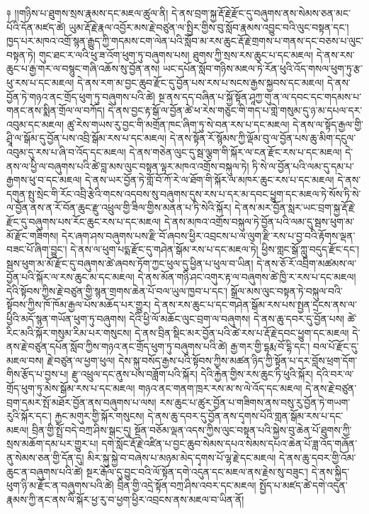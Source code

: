 \documentclass{article}
\begin{document}
༈ །།གཉིས་པ་ཐུགས་སྲས་རྣམས་དང་མཇལ་ཚུལ་ནི། དེ་ནས་བྲག་སྐྱ་རྡོ་རྗེ་རྫོང་དུ་བཞུགས་ནས་སེམས་ཅན་མང་པོའི་དོན་མཛད་ཚེ། ཡུམ་རྡོ་རྗེ་རྣལ་འབྱོར་མས་རྗེ་བཙུན་ལ་སྤྱིར་གྱིས་བུ་སློབ་རྣམས་འབྱུང་བའི་ལུང་བསྟན་དང་། ཁྱད་པར་མཁའ་འགྲོ་སྙན་རྒྱུད་ཀྱི་གདམས་ངག་ལེན་པའི་སློབ་མ་རས་ཆུང་རྡོ་རྗེ་གྲགས་པ་གནས་དང་བཅས་པ་ལུང་བསྟན་ཏེ། གུང་ཐང་ར་ལའི་ཕུ་ཟ་འོག་ཕུག་ཏུ་བཞུགས་པས། ཐུགས་ཀྱི་སྲས་རས་ཆུང་པ་དང་མཇལ། དེ་ནས་རས་ཆུང་པ་རྒྱ་གར་ལ་བསྙུང་གཞི་འཆོས་སུ་བྱོན་ནས། ཡང་དཔོན་སློབ་གཉིས་མཇལ་ཏེ་རོན་ཕུའི་འོད་གསལ་ཕུག་ཏུ་རྩ་ཕུ་རས་པ་དང་མཇལ། དེ་ནས་རག་མ་བྱང་ཆུབ་རྫོང་དུ་བྱོན་པས་རས་པ་སངས་རྒྱས་སྐྱབས་དང་མཇལ། དེ་ནས་བྱོན་ཏེ་གཉའ་ནང་གྲོད་ཕུག་ཏུ་བཞུགས་པའི་ཚེ། སྔ་ནས་དད་བཞིན་པ་སྐྱོ་སྟོན་ཤཱཀྱ་གུ་ན་ལ་དབང་དང་གདམས་པ་གནང་ནས་སྨིན་གྲོལ་ལ་བཀོད། དེ་ནས་བྱང་རྟ་སྒོ་ལ་བྱོན་ཚེ་ཕ་རེས་གཅུང་གི་གད་པ་གླེ་གསུམ་དུ་ཉ་མ་དཔལ་དར་འབུམ་དང་མཇལ། ཚུ་རེས་གཡས་རུ་བྱང་གི་མགྲོན་ཁང་ཞིག་ཏུ་སེ་བན་རས་པ་དང་མཇལ། དེ་ནས་ལ་སྟོད་རྒྱལ་གྱི་ཤྲཱི་ལ་སྒོམ་དུ་བྱོན་པས་འབྲི་སྒོམ་རས་པ་དང་མཇལ། དེ་ནས་སྟོན་རོ་སྙོམས་ཀྱི་ལྡོམ་བུ་ལ་བྱོན་པས་ཆུ་མིག་དངུལ་འབུམ་དུ་རས་པ་ཞི་བ་འོད་དང་མཇལ། དེ་ནས་གཅེན་ལུང་དུ་སྦ་ལྕག་གི་སྐོར་ལ་ངན་རྫོང་རས་པ་དང་མཇལ། དེ་ནས་ལ་ཕྱི་ལ་བཞུགས་པའི་ཚེ་བླ་མས་ལུང་བསྟན་ལྟར་མཁའ་འགྲོས་བསྐུལ་ཏེ། ཏི་སེ་ལ་བྱོན་པའི་ལམ་དུ་དམ་པ་རྒྱགས་ཕུ་བ་དང་མཇལ། དེ་ནས་ཡར་བྱོན་ཏེ་གློ་བོ་ཀོ་རེ་ལ་ཐོག་གི་སྐོར་ལ་མཁར་ཆུང་རས་པ་དང་མཇལ། དེ་ནས་དགུན་སྤུ་སྲེང་གི་རོང་འབྲི་རྩེའི་གངས་འདབས་སུ་བཞུགས་དུས་རས་པ་དར་མ་དབང་ཕྱུག་དང་མཇལ་ཏེ་སོས་ཏི་སེ་ལ་བྱོན་ནས་ན་རོ་བོན་ཆུང་རྫུ་འཕྲུལ་གྱི་ཟིལ་གྱིས་མནན་པ་ཏི་སེའི་སྐོར། དེ་ནས་མར་བྱོན་སླར་ཡང་བྲག་སྐྱ་རྡོ་རྗེ་རྫོང་དུ་བཞུགས་པས་རོང་ཆུང་རས་པ་དང་མཇལ། དེ་ནས་མཁའ་འགྲོས་བསྐུལ་ཏེ་བྱོན་པའི་ལམ་དུ་སྦས་ཕུག་མ་མོ་རྫོང་གཟིགས། དེར་ཞག་ཤས་བཞུགས་པས་རྫི་བོ་ཞབས་ཕྱིར་འབྲངས་པ་ལ་ལུག་རྫི་རས་པ་བྱ་བའི་རྟོགས་ལྡན་བཟང་པོ་ཞིག་བྱུང་། དེ་ནས་ལ་ཕུག་པདྨ་རྫོང་དུ་གཤེན་སྒོམ་རས་པ་དང་མཇལ་ཏེ། ཕྱིས་གླང་སྒོ་ཀླུ་བདུད་རྫོང་དང་། སྦས་ཕུག་མ་མོ་རྫོང་དུ་བཞུགས་ཚེ་ཞབས་ཏོག་ཀྱང་ཕུལ་དུ་ཕྱིན་པ་ཕུལ་བ་ཡིན། དེ་ནས་ཅོ་རོ་འབྲིག་མཚམས་ལ་བྱོན་པའི་སྐོར་ལ་རས་ཆུང་མ་དང་མཇལ། དེ་ནས་མོན་གཉི་ཤང་འགུར་རྟ་ལ་བཞུགས་ཚེ་ཁྱི་ར་རས་པ་དང་མཇལ། དེའི་སྟོབས་ཀྱིས་རྗེ་བཙུན་གྱི་སྙན་གྲགས་ཆེན་པོ་བལ་ཡུལ་ཁྱབ་པ་དང་། སྒྲོལ་མས་ལུང་བསྟན་ཏེ་བསྐུལ་བའི་སྟོབས་ཀྱིས་ཁོ་ཁོམ་རྒྱལ་པོས་མཆོད་པར་གྱུར། དེ་ནས་རས་ཆུང་པ་དང་གཤེན་སྒོམ་རས་པས་སྤྱན་དྲངས་ནས་ལ་ཕྱིའི་མདོ་སྙན་གཡོན་ཕུག་ཏུ་བཞུགས། དེའི་ཕྱི་ལོ་མཆོང་ལུང་བྲག་ལ་བཞུགས། དེ་ནས་ཆུ་དབར་དུ་བྱོན་པས། ཚེ་རིང་མའི་སྐོར་གསུམ་རིམ་པར་གསུངས། དེ་ནས་བྲིན་སྡིང་མར་བྱོན་པའི་ཚེ་རས་པ་རྡོ་རྗེ་དབང་ཕྱུག་དང་མཇལ། དེ་ནས་རྗེ་བཙུན་དཔོན་སློབ་ཀྱིས་གཉའ་ནང་གྲོད་ཕུག་ཏུ་བཞུགས་པའི་ཚེ། རྒྱ་གར་གྱི་དྷརྨ་བོ་དྷི་དང་། བལ་པོ་རྫོང་དུ་མཇལ་བས། རྗེ་བཙུན་ལ་ཕྱག་ཕུལ། དེས་སྐུ་བསོད་རྒྱས་པའི་སྟོབས་ཀྱིས་མཚན་ཉིད་ཀྱི་སྟོན་པ་དར་བློས་ཕྲག་དོག་གིས་རྩོད་པ་བྱས་པ། རྫུ་འཕྲུལ་དང་ནུས་པས་བཟློག་པའི་སྐོར། དེའི་རྐྱེན་གྱིས་རས་ཆུང་ཏི་ཕུའི་སྐོར། དེའི་བར་ལ་གྲོད་ཕུག་ཏུ་མེས་སྒོམ་རས་པ་དང་མཇལ། གཉའ་ནང་གནག་ཁྲར་རས་མ་ས་ལེ་འོད་དང་མཇལ། དེ་ནས་རྗེ་བཙུན་བྲག་དམར་སྤོ་མཐོར་བྱོན་ནས་བཞུགས་པ་ལས། རས་ཆུང་པ་ཚུར་བྱོན་པ་གཟིགས་ནས་བསུ་རུ་བྱོན་ཏེ་གཡག་རུའི་སྐོར་དང་། རྐྱང་མགུར་གྱི་སྐོར་གསུངས། དེ་ནས་ཆུ་དབར་དུ་བྱོན་ནས་དྭགས་པོའི་གླན་སྒོམ་རས་པ་དང་མཇལ། བྲིན་གྱི་སྤྲོ་བདེ་བཀྲ་ཤིས་སྒང་དུ། སྔོན་བཅོམ་ལྡན་འདས་ཀྱིས་ལུང་བསྟན་པའི་སྐྱེས་བུ་ཆེན་པོ་ཐུགས་ཀྱི་སྲས་མཆོག་དམ་པར་གྱུར་པ། དགེ་སློང་རྡོ་རྗེ་འཛིན་པ་བྱང་ཆུབ་སེམས་དཔའ་སེམས་དཔའ་ཆེན་པོ་ཟླ་འོད་གཞོན་ནུ་སེམས་ཅན་གྱི་དོན་དུ། མིར་སྐུ་སྐྱེ་བ་བཞེས་པ་མཉམ་མེད་དྭགས་པོ་ལྷ་རྗེ་དང་མཇལ། དེ་ནས་ཆུ་དབར་གྱི་འོམ་ཆུང་ན་བཞུགས་པའི་ཚེ། སྔར་རྒོལ་དུ་བྱུང་བའི་ལོ་སྟོན་དགེ་འདུན་དང་མཇལ་ནས་རྗེས་སུ་བཟུང་། དེ་ནས་སྐྱིད་ཕུག་ཉི་མ་རྫོང་ན་བཞུགས་པའི་ཚེ། བྲིན་གྱི་འདྲེ་སྟོན་བཀྲ་ཤིས་འབར་དང་མཇལ། སྤྱོད་པ་མཛད་ཚེ་དགེ་འདུན་རྣམས་ཀྱི་ནང་ནས་ལི་སྐོར་ཕྱ་རུ་བ་ཕྱག་ཕྱིར་འབྲངས་ནས་མཇལ་བ་ཡིན་ནོ། 
\end{document}

